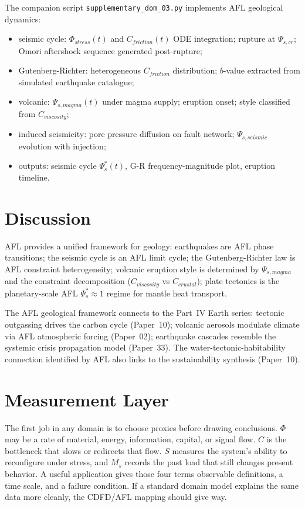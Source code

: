 \documentclass[11pt]{article}
\begin{document}
The companion script \texttt{supplementary\_dom\_03.py} implements AFL geological dynamics:
\begin{itemize}
    \item seismic cycle: $\Phi_{stress}(t)$ and $C_{friction}(t)$ ODE integration; rupture at
          $\Psi_{s,cr}$; Omori aftershock sequence generated post-rupture;
    \item Gutenberg-Richter: heterogeneous $C_{friction}$ distribution; $b$-value extracted from
          simulated earthquake catalogue;
    \item volcanic: $\Psi_{s,magma}(t)$ under magma supply; eruption onset; style classified from
          $C_{viscosity}$;
    \item induced seismicity: pore pressure diffusion on fault network; $\Psi_{s,seismic}$ evolution
          with injection;
    \item outputs: seismic cycle $\Psi_s^*(t)$, G-R frequency-magnitude plot, eruption timeline.
\end{itemize}

\section{Discussion}

AFL provides a unified framework for geology: earthquakes are AFL phase transitions; the seismic
cycle is an AFL limit cycle; the Gutenberg-Richter law is AFL constraint heterogeneity; volcanic
eruption style is determined by $\Psi_{s,magma}$ and the constraint decomposition ($C_{viscosity}$
vs $C_{crustal}$); plate tectonics is the planetary-scale AFL $\Psi_s^* \approx 1$ regime for
mantle heat transport.

The AFL geological framework connects to the Part~IV Earth series: tectonic outgassing drives
the carbon cycle (Paper~10); volcanic aerosols modulate climate via AFL atmospheric forcing
(Paper~02); earthquake cascades resemble the systemic crisis propagation model (Paper~33).
The water-tectonic-habitability connection identified by AFL also links to the sustainability
synthesis (Paper~10).



\section{Measurement Layer}

The first job in any domain is to choose proxies before drawing conclusions. $\Phi$ may be a rate of material, energy, information, capital, or signal flow. $C$ is the bottleneck that slows or redirects that flow. $S$ measures the system's ability to reconfigure under stress, and $M_s$ records the past load that still changes present behavior. A useful application gives those four terms observable definitions, a time scale, and a failure condition. If a standard domain model explains the same data more cleanly, the CDFD/AFL mapping should give way.
\end{document}
